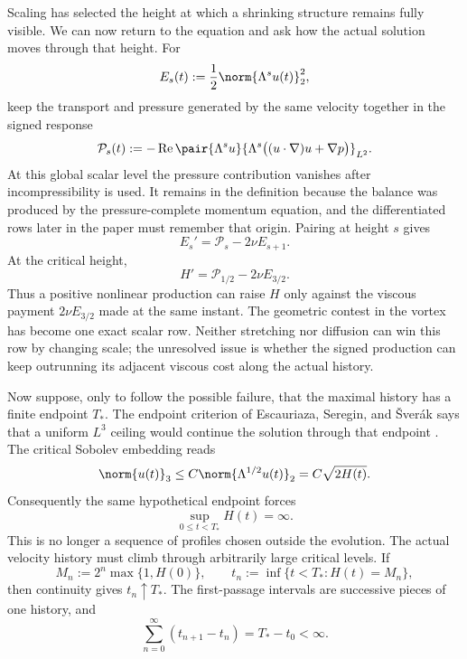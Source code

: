 Scaling has selected the height at which a shrinking structure remains fully
visible.  We can now return to the equation and ask how the actual solution
moves through that height.  For
\[
  E_s(t):=\frac12\norm{\Lambda^su(t)}_2^2,
\]
keep the transport and pressure generated by the same velocity together in
the signed response
\[
  \mathcal P_s(t)
  :=-
  \operatorname{Re}
  \pair{\Lambda^su}
  {\Lambda^s\bigl((u\cdot\nabla)u+\nabla p\bigr)}_{L^2}.
\]
At this global scalar level the pressure contribution vanishes after
incompressibility is used.  It remains in the definition because the balance
was produced by the pressure-complete momentum equation, and the differentiated
rows later in the paper must remember that origin.  Pairing at height \(s\)
gives
\begin{equation}\label{eq:BodySpatialEnergyBalanceIntro}
  E_s'=\mathcal P_s-2\nu E_{s+1}.
\end{equation}
At the critical height,
\begin{equation}\label{eq:BodyCriticalHeightBalanceIntro}
  H'=\mathcal P_{1/2}-2\nu E_{3/2}.
\end{equation}
Thus a positive nonlinear production can raise \(H\) only against the viscous
payment \(2\nu E_{3/2}\) made at the same instant.  The geometric contest in
the vortex has become one exact scalar row.  Neither stretching nor diffusion
can win this row by changing scale; the unresolved issue is whether the signed
production can keep outrunning its adjacent viscous cost along the actual
history.

Now suppose, only to follow the possible failure, that the maximal history has
a finite endpoint \(T_*\).  The endpoint criterion of Escauriaza, Seregin, and
\v{S}ver{\'a}k says that a uniform \(L^3\) ceiling would continue the solution
through that endpoint \parencite{EscauriazaSereginSverak2003}.  The critical
Sobolev embedding reads
\begin{equation}\label{eq:BodyCriticalHeightControlsLThree}
  \norm{u(t)}_3
  \leq C\norm{\Lambda^{1/2}u(t)}_2
  =C\sqrt{2H(t)}.
\end{equation}
Consequently the same hypothetical endpoint forces
\begin{equation}\label{eq:BodyFiniteEndpointForcesCriticalEscape}
  \sup_{0\leq t<T_*}H(t)=\infty.
\end{equation}
This is no longer a sequence of profiles chosen outside the evolution.  The
actual velocity history must climb through arbitrarily large critical levels.
If
\[
  M_n:=2^n\max\{1,H(0)\},
  \qquad
  t_n:=\inf\{t<T_*:H(t)=M_n\},
\]
then continuity gives \(t_n\uparrow T_*\).  The first-passage intervals are
successive pieces of one history, and
\begin{equation}\label{eq:BodyActualZenoIntervals}
  \sum_{n=0}^{\infty}(t_{n+1}-t_n)=T_*-t_0<\infty.
\end{equation}

